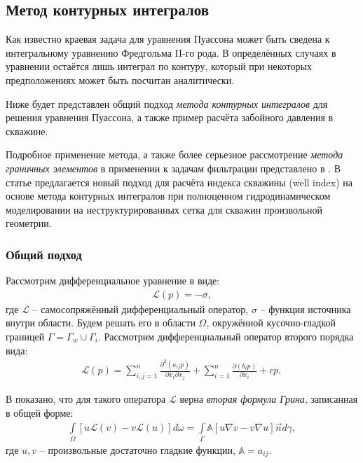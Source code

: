 \subsection{Метод контурных интегралов}
	Как известно краевая задача для уравнения Пуассона может быть сведена к интегральному уравнению Фредгольма II-го рода. В определённых случаях в уравнении остаётся лишь интеграл по контуру, который при некоторых предположениях может быть посчитан аналитически. 
	
	Ниже будет представлен общий подход \textit{метода контурных интегралов} для решения уравнения Пуассона, а также пример расчёта забойного давления в скважине.
	
	Подробное применение метода, а также более серьезное рассмотрение \textit{метода граничных элементов} в применении к задачам фильтрации представлено в \cite{diss}.
	В статье \cite{main} предлагается новый подход для расчёта индекса скважины (well index) на основе метода контурных интегралов при полноценном гидродинамическом моделировании на неструктурированных сетка для скважин произвольной геометрии.
	
\subsubsection{Общий подход}
	Рассмотрим дифференциальное уравнение в виде:
\begin{align}
	\label{poisson}
	\mathcal{L}(p) = -\sigma,
\end{align}
	где $\mathcal{L}$ -- самосопряжённый дифференциальный оператор,
	$\sigma$ -- функция источника внутри области.
	Будем решать его в области $\Omega$, окружённой кусочно-гладкой границей $\Gamma = \Gamma_w \cup \Gamma_i$. 
	Рассмотрим дифференциальный оператор второго порядка вида:
\begin{align}
	\label{operator}
	\mathcal{L}(p) = \sum_{i,j=1}^{n}\frac{\partial^2(a_{ij}p)}{\partial x_i \partial x_j} + \sum_{i=1}^n \frac{\partial(b_i p)}{\partial x_i} + cp, 
\end{align}

	В \cite{math} показано, что для такого оператора $\mathcal{L}$ верна \textit{вторая формула Грина}, записанная в общей форме:
\begin{align}
	\label{formula}
	\int\limits_\Omega \left[u\mathcal{L}(v)-v\mathcal{L}(u)\right]d\omega = \int\limits_\Gamma \mathbb{A}\left[u\nabla v - v\nabla u\right] \vec{n}d\gamma,
\end{align}
	где $u, v$ -- произвольные достаточно гладкие функции,
	$\mathbb{A} = a_{ij}$.
	
